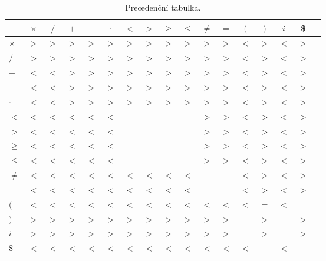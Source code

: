 \documentclass[a4paper, 12pt]{article}
\begin{document}
    \begin{table}[h]
    \centering
    \begin{tabular}[p]{| l | c | c | c | c | c | c | c | c | c | c | c | c | c | c | c | c |}
        \hline
        &   \textbf{$\times$} & \textbf{$/$} & \textbf{$+$} & \textbf{$-$} & \textbf{$\cdot$} & \textbf{$<$} & \textbf{$>$} & \textbf{{$\geq$}} & \textbf{$\leq$} & \textbf{$\neq$} & \textbf{$=$} & \textbf{$($} & \textbf{$)$} & \textbf{$i$} & \textbf{\$} \\
        \hline
        \textbf{$\times$} &
            $>$ & $>$ & $>$ & $>$ & $>$ & $>$ & $>$ & $>$ & $>$ & $>$ & $>$ & $<$ & $>$ & $<$ & $>$ \\
        \textbf{$/$} &
            $>$ & $>$ & $>$ & $>$ & $>$ & $>$ & $>$ & $>$ & $>$ & $>$ & $>$ & $<$ & $>$ & $<$ & $>$ \\
        \textbf{$+$} &
            $<$ & $<$ & $>$ & $>$ & $>$ & $>$ & $>$ & $>$ & $>$ & $>$ & $>$ & $<$ & $>$ & $<$ & $>$ \\
        \textbf{$-$} &
            $<$ & $<$ & $>$ & $>$ & $>$ & $>$ & $>$ & $>$ & $>$ & $>$ & $>$ & $<$ & $>$ & $<$ & $>$ \\
        \textbf{$\cdot$} &
            $<$ & $<$ & $>$ & $>$ & $>$ & $>$ & $>$ & $>$ & $>$ & $>$ & $>$ & $<$ & $>$ & $<$ & $>$ \\
        \textbf{$<$} &
            $<$ & $<$ & $<$ & $<$ & $<$ &     &     &     &     & $>$ & $>$ & $<$ & $>$ & $<$ & $>$ \\
        \textbf{$>$} &
            $<$ & $<$ & $<$ & $<$ & $<$ &     &     &     &     & $>$ & $>$ & $<$ & $>$ & $<$ & $>$ \\
        \textbf{$\geq$} &
            $<$ & $<$ & $<$ & $<$ & $<$ &     &     &     &     & $>$ & $>$ & $<$ & $>$ & $<$ & $>$ \\
        \textbf{$\leq$} &
            $<$ & $<$ & $<$ & $<$ & $<$ &     &     &     &     & $>$ & $>$ & $<$ & $>$ & $<$ & $>$ \\
        \textbf{$\neq$} &
            $<$ & $<$ & $<$ & $<$ & $<$ & $<$ & $<$ & $<$ & $<$ &     &     & $<$ & $>$ & $<$ & $>$ \\
        \textbf{$=$} &
            $<$ & $<$ & $<$ & $<$ & $<$ & $<$ & $<$ & $<$ & $<$ &     &     & $<$ & $>$ & $<$ & $>$ \\
        \textbf{$($} &
            $<$ & $<$ & $<$ & $<$ & $<$ & $<$ & $<$ & $<$ & $<$ & $<$ & $<$ & $<$ & $=$ & $<$ &     \\ 
        \textbf{$)$} &
            $>$ & $>$ & $>$ & $>$ & $>$ & $>$ & $>$ & $>$ & $>$ & $>$ & $>$ &     & $>$ &     & $>$ \\ 
        \textbf{$i$} &
            $>$ & $>$ & $>$ & $>$ & $>$ & $>$ & $>$ & $>$ & $>$ & $>$ & $>$ &     & $>$ &     & $>$ \\ 
        \textbf{$\$$} &
            $<$ & $<$ & $<$ & $<$ & $<$ & $<$ & $<$ & $<$ & $<$ & $<$ & $<$ & $<$ &     & $<$ &     \\ 
        \hline
    \end{tabular}
    \caption{Precedenční tabulka.}
    \label{tabulka precedence}
\end{table}
\end{document}
